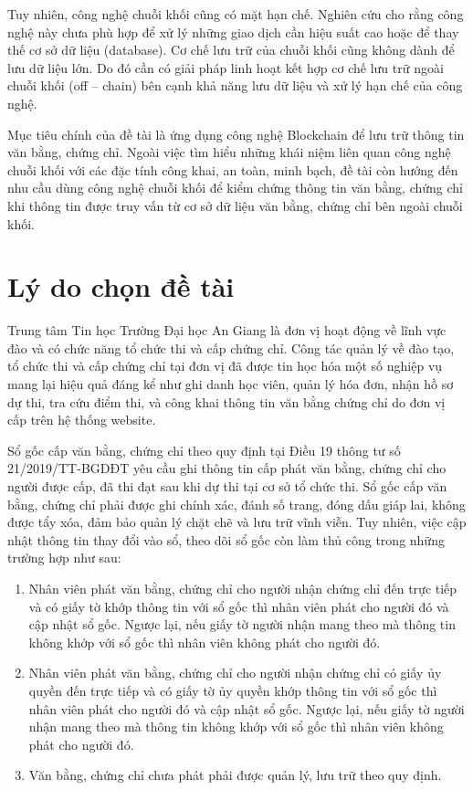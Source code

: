 Tuy nhiên, công nghệ chuỗi khối cũng có mặt hạn chế.
Nghiên cứu \cite{CHEN20191122} cho rằng công nghệ này chưa phù hợp để xử lý những giao dịch cần hiệu suất cao hoặc để thay thế cơ sở dữ liệu (database).
Cơ chế lưu trữ của chuỗi khối cũng không dành để lưu dữ liệu lớn.
Do đó cần có giải pháp linh hoạt kết hợp cơ chế lưu trữ ngoài chuỗi khối (off -- chain) bên cạnh khả năng lưu dữ liệu và xử lý hạn chế của công nghệ.

Mục tiêu chính của đề tài là ứng dụng công nghệ Blockchain để lưu trữ thông tin văn bằng, chứng chỉ. Ngoài việc tìm hiểu những khái niệm liên quan công nghệ chuỗi khối với các đặc tính công khai, an toàn, minh bạch, đề tài còn hướng đến nhu cầu dùng công nghệ chuỗi khối để kiểm chứng thông tin văn bằng, chứng chỉ khi thông tin được truy vấn từ cơ sở dữ liệu văn bằng, chứng chỉ bên ngoài chuỗi khối.

\section{Lý do chọn đề tài}

Trung tâm Tin học Trường Đại học An Giang là đơn vị hoạt động về lĩnh vực đào và có chức năng tổ chức thi và cấp chứng chỉ.
Công tác quản lý về đào tạo, tổ chức thi và cấp chứng chỉ tại đơn vị đã được tin học hóa một số nghiệp vụ mang lại hiệu quả đáng kể như ghi danh học viên, quản lý hóa đơn, nhận hồ sơ dự thi, tra cứu điểm thi, và công khai thông tin văn bằng chứng chỉ do đơn vị cấp trên hệ thống website.

Sổ gốc cấp văn bằng, chứng chỉ theo quy định tại Điều 19 thông tư số 21/2019/TT-BGDĐT yêu cầu ghi thông tin cấp phát văn bằng, chứng chỉ cho người được cấp, đã thi đạt sau khi dự thi tại cơ sở tổ chức thi. Sổ gốc cấp văn bằng, chứng chỉ phải được ghi chính xác, đánh số trang, đóng dấu giáp lai, không được tẩy xóa, đảm bảo quản lý chặt chẽ và lưu trữ vĩnh viễn. Tuy nhiên, việc cập nhật thông tin thay đổi vào sổ, theo dõi sổ gốc còn làm thủ công trong những trường hợp như sau:

\begin{enumerate}
\item Nhân viên phát văn bằng, chứng chỉ cho người nhận chứng chỉ đến trực tiếp và có giấy tờ khớp thông tin với sổ gốc thì nhân viên phát cho người đó và cập nhật sổ gốc. Ngược lại, nếu giấy tờ người nhận mang theo mà thông tin không khớp với sổ gốc thì nhân viên không phát cho người đó.

\item Nhân viên phát văn bằng, chứng chỉ cho người nhận chứng chỉ có giấy ủy quyền đến trực tiếp và có giấy tờ ủy quyền khớp thông tin với sổ gốc thì nhân viên phát cho người đó và cập nhật sổ gốc. Ngược lại, nếu giấy tờ người nhận mang theo mà thông tin không khớp với sổ gốc thì nhân viên không phát cho người đó.

\item Văn bằng, chứng chỉ chưa phát phải được quản lý, lưu trữ theo quy định.
\end{enumerate}

